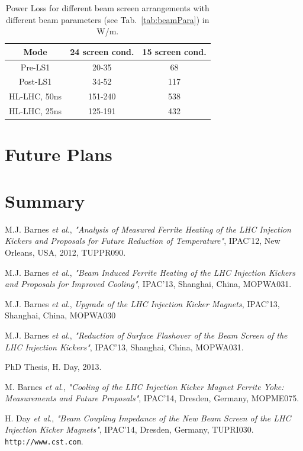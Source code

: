 \documentclass[a4paper,
              ]{jacow}
\begin{document}
\begin{table}
\caption{Power Loss for different beam screen arrangements with different beam parameters (see Tab.~\ref{tab:beamPara}) in W/m.}
\label{tab:powLoss}
\begin{center}
\begin{tabular}{c | c | c}
Mode & 24 screen cond. & 15 screen cond. \\ \hline 
Pre-LS1 & 20-35 & 68 \\ \hline 
Post-LS1 & 34-52 & 117 \\ \hline 
HL-LHC, 50ns & 151-240 & 538  \\ \hline 
HL-LHC, 25ns & 125-191 & 432  \\ 
\end{tabular}
\end{center}
\end{table}

\section{Future Plans}


\section{Summary}




\begin{thebibliography}{9}

M.J. Barnes \emph{et al}., \emph{"Analysis of Measured Ferrite Heating of the LHC Injection Kickers and Proposals for Future Reduction of Temperature"}, IPAC'12, New Orleans, USA, 2012, TUPPR090.

M.J. Barnes \emph{et al}., \emph{"Beam Induced Ferrite Heating of the LHC Injection Kickers and Proposals for Improved Cooling"}, IPAC'13, Shanghai, China, MOPWA031.

M.J. Barnes \emph{et al}., \emph{Upgrade of the LHC Injection Kicker Magnets}, IPAC'13, Shanghai, China, MOPWA030

M.J. Barnes \emph{et al}., \emph{"Reduction of Surface Flashover of the Beam Screen of the LHC Injection Kickers"}, IPAC'13, Shanghai, China, MOPWA031.

PhD Thesis, H. Day, 2013.

M. Barnes \emph{et al}., \emph{"Cooling of the LHC Injection Kicker Magnet Ferrite Yoke: Measurements and Future Proposals"}, IPAC'14, Dresden, Germany, MOPME075.

H. Day \emph{et al}., \emph{"Beam Coupling Impedance of the New Beam Screen of the LHC Injection Kicker Magnets"}, IPAC'14, Dresden, Germany, TUPRI030.
\texttt{http://www.cst.com}.

\end{thebibliography}
\end{document}
